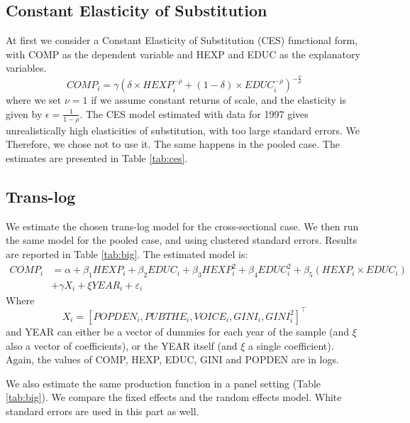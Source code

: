 \documentclass[12pt,a4paper]{article}\usepackage[]{graphicx}\usepackage[]{color}
\begin{document}
\subsection{Constant Elasticity of Substitution}
At first we consider a Constant Elasticity of Substitution (CES) functional form, with COMP as the dependent variable and HEXP and EDUC as the explanatory variables.
\begin{equation}
COMP_i = \gamma \left( \delta \times HEXP_i^{-\rho} + (1- \delta) \times EDUC_i^{-\rho} \right)^{-\frac{\nu}{\rho}}
\end{equation}
where we set $\nu = 1$ if we assume constant returns of scale, and the elasticity is given by $\epsilon = \frac{1}{1- \rho}$. The CES model estimated with data for 1997 gives unrealistically high elasticities of substitution, with too large standard errors. We Therefore, we chose not to use it. The same happens in the pooled case. The estimates are presented in Table \ref{tab:ces}.

\subsection{Trans-log}
We estimate the chosen trans-log model for the cross-sectional case. We then run the same model for the pooled case, and using clustered standard errors. Results are reported in Table \ref{tab:big}. The estimated model is:
\begin{equation}
\begin{aligned}
COMP_i &= \alpha + \beta_1 HEXP_i + \beta_2 EDUC_i + \beta_3 HEXP_i^2 + \beta_4 EDUC_i^2 + \beta_5 \left(HEXP_i \times EDUC_i\right) \\ &+ \gamma X_i + \xi YEAR_i + \varepsilon_i
\end{aligned}
\end{equation}
Where $$ X_i = \left[ POPDEN_i, PUBTHE_i, VOICE_i, GINI_i, GINI_i^2 \right]^\top$$ and YEAR can either be a vector of dummies for each year of the sample (and $\xi$ also a vector of coefficients), or the YEAR itself (and $\xi$ a single coefficient). Again, the values of COMP, HEXP, EDUC, GINI and POPDEN are in logs.


We also estimate the same production function in a panel setting (Table \ref{tab:big}). We compare the fixed effects and the random effects model. White standard errors are used in this part as well.
\end{document}
